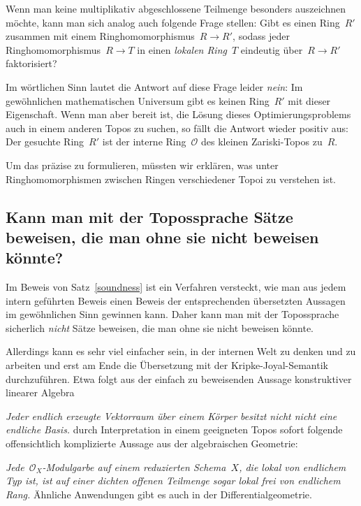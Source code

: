 \documentclass[a4paper,ngerman,12pt]{scrartcl}
\theoremstyle{definition}
\theoremstyle{plain}
\theoremstyle{remark}
\renewcommand{\O}{\mathcal{O}}
\renewcommand{\_}{\mathpunct{.}\,}
\newcommand{\?}{\,{:}\,}
\newenvironment{indentblock}{%
  \list{}{\leftmargin\leftmargin}%
  \item\relax
}{%
  \endlist
}
\begin{document}
Wenn man keine multiplikativ abgeschlossene Teilmenge besonders auszeichnen
möchte, kann man sich analog auch folgende Frage stellen: Gibt es einen
Ring~$R'$ zusammen mit einem Ringhomomorphismus~$R \to R'$, sodass jeder
Ringhomomorphismus~$R \to T$ in einen \emph{lokalen Ring}~$T$ eindeutig über~$R
\to R'$ faktorisiert?

Im wörtlichen Sinn lautet die Antwort auf diese Frage leider \emph{nein}: Im
gewöhnlichen mathematischen Universum gibt es keinen Ring~$R'$ mit dieser
Eigenschaft. Wenn man aber bereit ist, die Lösung
dieses Optimierungsproblems auch in einem anderen Topos zu suchen, so fällt die
Antwort wieder positiv aus: Der gesuchte Ring~$R'$ ist der interne Ring~$\O$
des kleinen Zariski-Topos zu~$R$.

Um das präzise zu formulieren, müssten wir erklären, was unter
Ringhomomorphismen zwischen Ringen verschiedener Topoi zu verstehen ist.


\subsection*{Kann man mit der Topossprache Sätze beweisen, die man ohne sie
nicht beweisen könnte?}

Im Beweis von Satz~\ref{soundness} ist ein Verfahren versteckt, wie man aus
jedem intern geführten Beweis einen Beweis der entsprechenden übersetzten
Aussagen im gewöhnlichen Sinn gewinnen kann. Daher kann man mit der
Topossprache sicherlich \emph{nicht} Sätze beweisen, die man ohne sie nicht
beweisen könnte.

Allerdings kann es sehr viel einfacher sein, in der internen Welt zu denken und
zu arbeiten
und erst am Ende die Übersetzung mit der Kripke-Joyal-Semantik durchzuführen.
Etwa folgt aus der einfach zu beweisenden Aussage konstruktiver linearer
Algebra
\begin{indentblock}
\emph{Jeder endlich erzeugte Vektorraum über einem Körper besitzt nicht nicht
eine endliche Basis.}
\end{indentblock}
durch Interpretation in einem geeigneten Topos sofort folgende offensichtlich
komplizierte Aussage aus der algebraischen Geometrie:
\begin{indentblock}
\emph{Jede~$\O_X$-Modulgarbe auf einem reduzierten Schema~$X$, die lokal von
endlichem Typ ist, ist auf einer dichten offenen Teilmenge sogar lokal frei von
endlichem Rang.}
\end{indentblock}
Ähnliche Anwendungen gibt es auch in der Differentialgeometrie.
\end{document}
